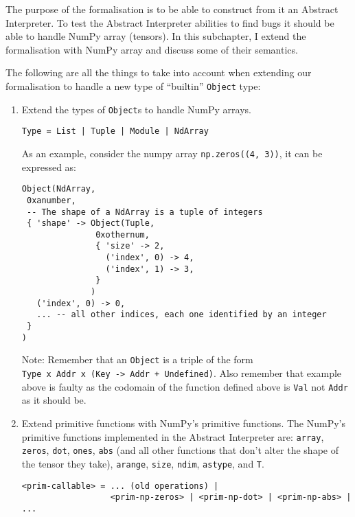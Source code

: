 The purpose of the formalisation is to be able to construct from it an
Abstract Interpreter. To test the Abstract Interpreter abilities to find
bugs it should be able to handle NumPy array (tensors). In this
subchapter, I extend the formalisation with NumPy array and discuss some
of their semantics.

The following are all the things to take into account when extending our
formalisation to handle a new type of \enquote{builtin} \texttt{Object}
type:

\begin{enumerate}
\def\labelenumi{\arabic{enumi}.}
\item
  Extend the types of \texttt{Object}s to handle NumPy arrays.

\begin{verbatim}
Type = List | Tuple | Module | NdArray
\end{verbatim}

  As an example, consider the numpy array \texttt{np.zeros((4,\ 3))}, it
  can be expressed as:

\begin{verbatim}
Object(NdArray,
 0xanumber,
 -- The shape of a NdArray is a tuple of integers
 { 'shape' -> Object(Tuple,
               0xothernum,
               { 'size' -> 2,
                 ('index', 0) -> 4,
                 ('index', 1) -> 3,
               }
              )
   ('index', 0) -> 0,
   ... -- all other indices, each one identified by an integer
 }
)
\end{verbatim}

  Note: Remember that an \texttt{Object} is a triple of the form
  \texttt{Type\ x\ Addr\ x\ (Key\ -\textgreater{}\ Addr\ +\ Undefined)}.
  Also remember that example above is faulty as the codomain of the
  function defined above is \texttt{Val} not \texttt{Addr} as it should
  be.
\item
  Extend primitive functions with NumPy's primitive functions. The
  NumPy's primitive functions implemented in the Abstract Interpreter
  are: \texttt{array}, \texttt{zeros}, \texttt{dot}, \texttt{ones},
  \texttt{abs} (and all other functions that don't alter the shape of
  the tensor they take), \texttt{arange}, \texttt{size}, \texttt{ndim},
  \texttt{astype}, and \texttt{T}.

\begin{verbatim}
<prim-callable> = ... (old operations) |
                  <prim-np-zeros> | <prim-np-dot> | <prim-np-abs> | ...
\end{verbatim}


\end{enumerate}
